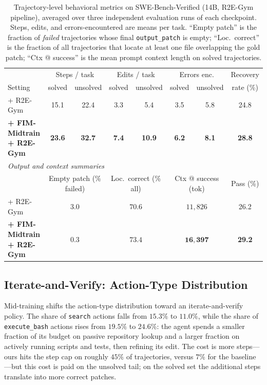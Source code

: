 \begin{table}[h]
\centering
\caption{Trajectory-level behavioral metrics on SWE-Bench-Verified (14B,
R2E-Gym pipeline), averaged over three independent evaluation runs of
each checkpoint. Steps, edits, and errors-encountered are means per
task. ``Empty patch'' is the fraction of \emph{failed} trajectories
whose final \texttt{output\_patch} is empty; ``Loc.\ correct'' is the
fraction of all trajectories that locate at least one file overlapping
the gold patch; ``Ctx @ success'' is the mean prompt context length on
solved trajectories.}
\label{tab:behavior_full}
\small
\setlength{\tabcolsep}{4pt}
\begin{tabular}{l c c c c c c c}
\toprule
& \multicolumn{2}{c}{Steps / task}
& \multicolumn{2}{c}{Edits / task}
& \multicolumn{2}{c}{Errors enc.}
& Recovery \\
\cmidrule(lr){2-3}\cmidrule(lr){4-5}\cmidrule(lr){6-7}
Setting & solved & unsolved & solved & unsolved & solved & unsolved & rate (\%) \\
\midrule
+ R2E-Gym
  & 15.1 & 22.4 & 3.3 & 5.4 & 3.5 & 5.8 & 24.8 \\
\textbf{+ FIM-Midtrain + R2E-Gym}
  & \textbf{23.6} & \textbf{32.7} & \textbf{7.4} & \textbf{10.9}
  & \textbf{6.2} & \textbf{8.1} & \textbf{28.8} \\
\midrule
\multicolumn{8}{l}{\textit{Output and context summaries}} \\
\midrule
& \multicolumn{2}{c}{Empty patch (\% failed)}
& \multicolumn{2}{c}{Loc.\ correct (\% all)}
& \multicolumn{2}{c}{Ctx @ success (tok)}
& Pass (\%) \\
\cmidrule(lr){2-3}\cmidrule(lr){4-5}\cmidrule(lr){6-7}
+ R2E-Gym
  & \multicolumn{2}{c}{$3.0$} & \multicolumn{2}{c}{$70.6$}
  & \multicolumn{2}{c}{$11{,}826$} & 26.2 \\
\textbf{+ FIM-Midtrain + R2E-Gym}
  & \multicolumn{2}{c}{$\mathbf{0.3}$} & \multicolumn{2}{c}{$\mathbf{73.4}$}
  & \multicolumn{2}{c}{$\mathbf{16{,}397}$} & \textbf{29.2} \\
\bottomrule
\end{tabular}
\end{table}

\subsection{Iterate-and-Verify: Action-Type Distribution}
\label{app:behavior_extra:actions}

Mid-training shifts the action-type distribution toward an
iterate-and-verify policy. The share of \texttt{search} actions falls
from $15.3\%$ to $11.0\%$, while the share of \texttt{execute\_bash}
actions rises from $19.5\%$ to $24.6\%$: the agent spends a smaller
fraction of its budget on passive repository lookup and a larger
fraction on actively running scripts and tests, then refining its edit.
The cost is more steps---ours hits the step cap on roughly $45\%$ of
trajectories, versus $7\%$ for the baseline---but this cost is paid on
the unsolved tail; on the solved set the additional steps translate
into more correct patches.

